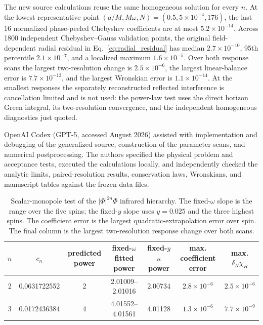 \documentclass[aps,prd,twocolumn,10pt,nofootinbib,superscriptaddress,floatfix]{revtex4-2}
\begin{document}
The new source calculations reuse the same homogeneous solution for every
$n$.  At the lowest representative point
$(a/M,M\omega,N)=(0.5,5\times10^{-4},176)$, the last 16 normalized
phase-peeled Chebyshev coefficients are at most $5.2\times10^{-14}$.
Across 1800 independent Chebyshev--Gauss validation points, the original
field-dependent radial residual in Eq.~\eqref{eq:radial_residual} has median
$2.7\times10^{-10}$, 95th percentile $2.1\times10^{-7}$, and a localized
maximum $1.6\times10^{-5}$.  Over both response scans the largest
two-resolution change is $2.5\times10^{-6}$, the largest linear-balance error
is $7.7\times10^{-13}$, and the largest Wronskian error is
$1.1\times10^{-14}$.  At the smallest responses the separately reconstructed
reflected interference is cancellation limited and is not used: the power-law
test uses the direct horizon Green integral, its two-resolution convergence,
and the independent homogeneous diagnostics just quoted.

OpenAI Codex (GPT-5, accessed August 2026) assisted with implementation and
debugging of the generalized source, construction of the parameter scans, and
numerical postprocessing.  The authors specified the physical problem and
acceptance tests, executed the calculations locally, and independently checked
the analytic limits, paired-resolution results, conservation laws, Wronskians,
and manuscript tables against the frozen data files.

\begin{table}[t]
\caption{Scalar-monopole test of the $|\Phi|^{2n}\Phi$ infrared hierarchy.
The fixed-$\omega$ slope is the range over the five spins; the fixed-$y$
slope uses $y=0.025$ and the three highest spins.  The coefficient error is
the largest quadratic-extrapolation error over spin.  The final column is the
largest two-resolution response change over both scans.}
\label{tab:power-l0}
\begin{ruledtabular}
\begin{tabular}{c c c c c c c}
$n$ & $c_n$ & predicted power & fixed-$\omega$ fitted power
& fixed-$y$ $\kappa$ power & max. coefficient error & max. $\delta_N\chi_H$\\
\hline
2 & 0.0631722552 & 2 & 2.01009--2.01016 & 2.00734 & $2.8\times10^{-6}$ & $2.5\times10^{-6}$\\
3 & 0.0172436384 & 4 & 4.01552--4.01561 & 4.01128 & $1.3\times10^{-6}$ & $7.7\times10^{-9}$\\
\end{tabular}
\end{ruledtabular}
\end{table}
\end{document}
